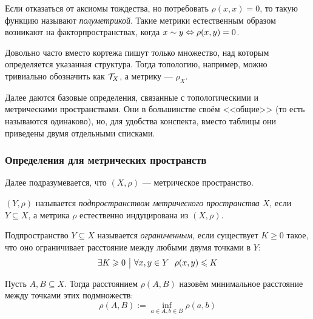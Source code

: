 \begin{note}
	Если отказаться от аксиомы тождества, но потребовать $\rho(x, x) = 0$, то такую функцию называют \textit{полуметрикой}. Такие метрики естественным образом возникают на факторпространствах, когда $x \sim y \Leftrightarrow \rho(x, y) = 0$.
\end{note}

\begin{note}
	Довольно часто вместо кортежа пишут только множество, над которым определяется указанная структура. Тогда топологию, например, можно тривиально обозначить как $\mathcal{T}_X$, а метрику --- $\rho_X$.
\end{note}

\begin{anote}
	Далее даются базовые определения, связанные с топологическими и метрическими пространствами. Они в большинстве своём <<общие>> (то есть называются одинаково), но, для удобства конспекта, вместо таблицы они приведены двумя отдельными списками.
\end{anote}

\subsubsection*{Определения для метрических пространств}

\begin{note}
	Далее подразумевается, что $(X, \rho)$ --- метрическое пространство.
\end{note}

\begin{definition}
	$(Y, \rho)$ называется \textit{подпространством метрического пространства $X$}, если $Y \subseteq X$, а метрика $\rho$ естественно индуцирована из $(X, \rho)$.
\end{definition}

\begin{definition}
	Подпространство $Y \subseteq X$ называется \textit{ограниченным}, если существует $K \ge 0$ такое, что оно ограничивает расстояние между любыми двумя точками в $Y$:
	\[
		\exists K \ge 0 \such \forall x, y \in Y\ \ \rho(x, y) \le K
	\]
\end{definition}

\begin{definition}
	Пусть $A, B \subseteq X$. Тогда расстоянием $\rho(A, B)$ назовём минимальное расстояние между точками этих подмножеств:
	\[
		\rho(A, B) := \inf_{a \in A, b \in B} \rho(a, b)
	\]
\end{definition}

